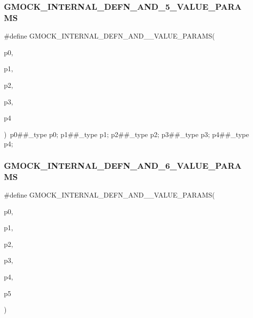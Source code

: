 \subsubsection{\texorpdfstring{GMOCK\_INTERNAL\_DEFN\_AND\_5\_VALUE\_PARAMS}{GMOCK\_INTERNAL\_DEFN\_AND\_5\_VALUE\_PARAMS}}
{\footnotesize\ttfamily \#define G\+M\+O\+C\+K\+\_\+\+I\+N\+T\+E\+R\+N\+A\+L\+\_\+\+D\+E\+F\+N\+\_\+\+A\+N\+D\+\_\+\_\+\+V\+A\+L\+U\+E\+\_\+\+P\+A\+R\+A\+MS(\begin{DoxyParamCaption}\item[{}]{p0,  }\item[{}]{p1,  }\item[{}]{p2,  }\item[{}]{p3,  }\item[{}]{p4 }\end{DoxyParamCaption})~p0\#\#\+\_\+type p0; p1\#\#\+\_\+type p1; p2\#\#\+\_\+type p2; p3\#\#\+\_\+type p3; p4\#\#\+\_\+type p4;}

\mbox{\label{_obj__test_2lib_2googletest-master_2googlemock_2include_2gmock_2gmock-generated-actions_8h_a4ba5920542abfa689a6517d21eb8860a}} 
\subsubsection{\texorpdfstring{GMOCK\_INTERNAL\_DEFN\_AND\_6\_VALUE\_PARAMS}{GMOCK\_INTERNAL\_DEFN\_AND\_6\_VALUE\_PARAMS}}
{\footnotesize\ttfamily \#define G\+M\+O\+C\+K\+\_\+\+I\+N\+T\+E\+R\+N\+A\+L\+\_\+\+D\+E\+F\+N\+\_\+\+A\+N\+D\+\_\+\_\+\+V\+A\+L\+U\+E\+\_\+\+P\+A\+R\+A\+MS(\begin{DoxyParamCaption}\item[{}]{p0,  }\item[{}]{p1,  }\item[{}]{p2,  }\item[{}]{p3,  }\item[{}]{p4,  }\item[{}]{p5 }\end{DoxyParamCaption})}

